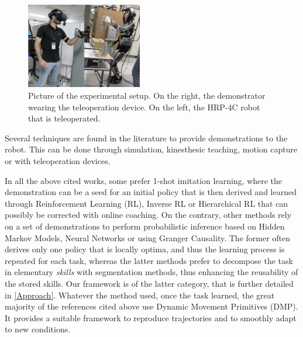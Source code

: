 \documentclass[a4paper, 10pt, conference]{ieeeconf}
\begin{document}
\begin{figure}[t]
  \centering
  \includegraphics[width=0.45\textwidth]{img/Setup.png}
  \caption{Picture of the experimental setup. On the right, the demonstrator wearing the teleoperation device. On the left, the HRP-4C robot that is teleoperated.}
  \label{fig:setup}
\end{figure}


Several techniques are found in the literature to provide demonstrations to the robot. This can be done through simulation\cite{sammut_learning_1992}, kinesthesic teaching\cite{wu_prim-lafd:_2022}, motion capture\cite{ramirez-amaro_understanding_2015} or with teleoperation devices. 

In all the above cited works, some prefer 1-shot imitation learning, where the demonstration can be a seed for an initial policy that is then derived and learned through Reinforcement Learning (RL)\cite{vecerik_practical_2019,stulp_reinforcement_2012}, Inverse RL\cite{rouot_inverse_2017} or Hierarchical RL\cite{zhao_variational_2023} that can possibly be corrected with online coaching\cite{advice_operator}. 
On the contrary, other methods rely on a set of demonstrations to perform probabilistic inference based on Hidden Markov Models\cite{rana_towards_2017}, Neural Networks\cite{zhang_deep_2018} or using Granger Causality\cite{chuck2023grangercausal}. The former often derives only one policy that is locally optima, and thus the learning process is repeated for each task, whereas the latter methods prefer to decompose the task in elementary \textit{skills} with segmentation methods, thus enhancing the reusability of the stored skills. Our framework is of the latter category, that is further detailed in \ref{Approach}. Whatever the method used, once the task learned, the great majority of the references cited above use Dynamic Movement Primitives (DMP)\cite{ijspeert_movement_2002,ijspeert_dynamical_2013}. It provides a suitable framework to reproduce trajectories and to smoothly adapt to new conditions. 
\end{document}
